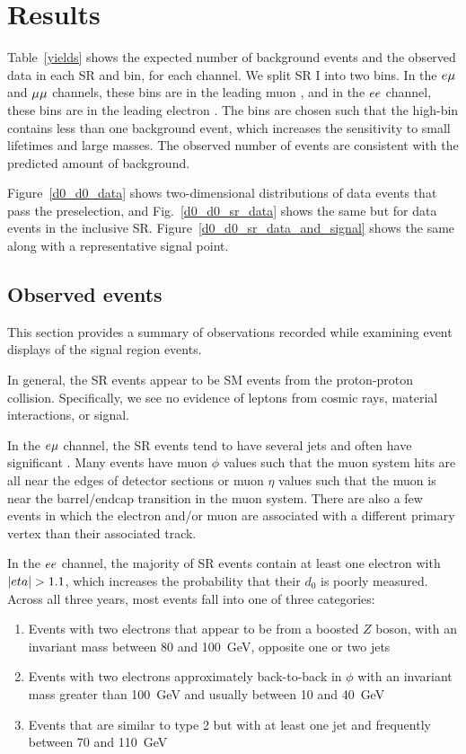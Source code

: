 \section{Results}
\label{results}

Table~\ref{yields} shows the expected number of background events and the observed data in each SR and \pt bin, for each channel. We split SR I into two bins. In the $e{\mu}$ and ${\mu}{\mu}$ channels, these bins are in the leading muon \pt, and in the $ee$ channel, these bins are in the leading electron \pt. The \pt bins are chosen such that the high-\pt bin contains less than one background event, which increases the sensitivity to small lifetimes and large masses. The observed number of events are consistent with the predicted amount of background.



Figure~\ref{d0_d0_data} shows two-dimensional \ad distributions of data events that pass the preselection, and Fig.~\ref{d0_d0_sr_data} shows the same but for data events in the inclusive SR. Figure~\ref{d0_d0_sr_data_and_signal} shows the same along with a representative signal point.



\subsection{Observed events}
This section provides a summary of observations recorded while examining event displays of the signal region events.

In general, the SR events appear to be SM events from the proton-proton collision. Specifically, we see no evidence of leptons from cosmic rays, material interactions, or signal.

In the $e{\mu}$ channel, the SR events tend to have several jets and often have significant \ptmiss. Many events have muon $\phi$ values such that the muon system hits are all near the edges of detector sections or muon $\eta$ values such that the muon is near the barrel/endcap transition in the muon system. There are also a few events in which the electron and/or muon are associated with a different primary vertex than their associated track.

In the $ee$ channel, the majority of SR events contain at least one electron with $\lvert eta \rvert > 1.1$, which increases the probability that their $d_0$ is poorly measured. Across all three years, most events fall into one of three categories: 
\begin{enumerate}
    \item Events with two electrons that appear to be from a boosted $Z$ boson, with an invariant mass between \num{80} and \SI{100}{\GeV}, opposite one or two jets
    \item Events with two electrons approximately back-to-back in $\phi$ with an invariant mass greater than \SI{100}{\GeV} and \ptmiss usually between \num{10} and \SI{40}{\GeV}
    \item Events that are similar to type 2 but with at least one jet and frequently \ptmiss between \num{70} and \SI{110}{\GeV}
\end{enumerate}

